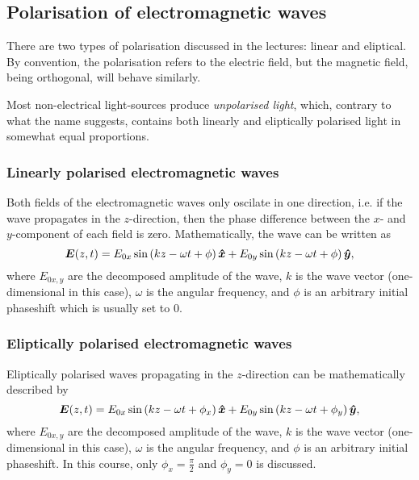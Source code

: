 \subsection{Polarisation of electromagnetic waves}
    There are two types of polarisation discussed in the lectures: linear and eliptical.
    By convention, the polarisation refers to the electric field, 
    but the magnetic field, being orthogonal, will behave similarly.
    
    Most non-electrical light-sources produce \textit{unpolarised light}, which, contrary to what the name suggests, 
    contains both linearly and eliptically polarised light in somewhat equal proportions. 

    \subsubsection{Linearly polarised electromagnetic waves}
        Both fields of the electromagnetic waves only oscilate in one direction,
        i.e. if the wave propagates in the $z$-direction, 
        then the phase difference between the $x$- and $y$-component of each field is zero.
        Mathematically, the wave can be written as
        \begin{equation}
            \E(z, t) = E_{0x}\sin\left(kz - \omega t + \phi\right)\hat{x} +
            E_{0y}\sin\left(kz - \omega t + \phi\right)\hat{y},
        \end{equation}
        where $E_{0x,y}$ are the decomposed amplitude of the wave, 
        $k$ is the wave vector (one-dimensional in this case), 
        $\omega$ is the angular frequency, 
        and $\phi$ is an arbitrary initial phaseshift which is usually set to 0.

    \subsubsection{Eliptically polarised electromagnetic waves}
        Eliptically polarised waves propagating in the $z$-direction can be mathematically described by
        \begin{equation}
            \E(z, t) = E_{0x}\sin\left(kz - \omega t + \phi_x \right)\hat{x} +
            E_{0y}\sin\left(kz - \omega t + \phi_y \right)\hat{y},
        \end{equation}
        where $E_{0x,y}$ are the decomposed amplitude of the wave, 
        $k$ is the wave vector (one-dimensional in this case), 
        $\omega$ is the angular frequency, 
        and $\phi$ is an arbitrary initial phaseshift. 
        In this course, only $\phi_x = \frac{\pi}{2}$ and $\phi_y = 0$ is discussed.
        
